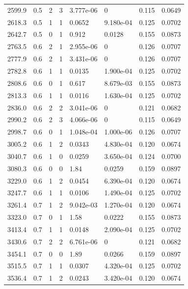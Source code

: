 \documentclass[preview]{standalone}
\begin{document}
{{{\begin{tabular}{L{1.2cm}C{1.2cm} C{0.3cm}C{0.5cm} C{1.4cm}C{1.4cm} C{1.4cm}C{1.4cm}}
  2599.9  &   0.5  & 2     &  3 &  3.777e-06  & 0  & 0.115 &  0.0649   \\ 
  2618.3  &   0.5  & 1     &  1 &  0.0652  & 9.180e-04  & 0.125 &  0.0702   \\ 
  2642.7  &   0.5  & 0     &  1 &  0.912  & 0.0128  & 0.155 &  0.0873   \\ 
  2763.5  &   0.6  & 2     &  1 &  2.955e-06  & 0  & 0.126 &  0.0707   \\ 
  2777.9  &   0.6  & 2     &  1 &  3.431e-06  & 0  & 0.126 &  0.0707   \\ 
  2782.8  &   0.6  & 1     &  1 &  0.0135  & 1.900e-04  & 0.125 &  0.0702   \\ 
  2808.6  &   0.6  & 0     &  1 &  0.617  & 8.679e-03  & 0.155 &  0.0873   \\ 
  2813.3  &   0.6  & 1     &  1 &  0.0116  & 1.630e-04  & 0.125 &  0.0702   \\ 
  2836.0  &   0.6  & 2     &  2 &  3.041e-06  & 0  & 0.121 &  0.0682   \\ 
  2990.2  &   0.6  & 2     &  3 &  4.066e-06  & 0  & 0.115 &  0.0649   \\ 
  2998.7  &   0.6  & 0     &  1 &  1.048e-04  & 1.000e-06  & 0.126 &  0.0707   \\ 
  3005.2  &   0.6  & 1     &  2 &  0.0343  & 4.830e-04  & 0.120 &  0.0674   \\ 
  3040.7  &   0.6  & 1     &  0 &  0.0259  & 3.650e-04  & 0.124 &  0.0700   \\ 
  3080.3  &   0.6  & 0     &  0 &  1.84  & 0.0259  & 0.159 &  0.0897   \\ 
  3229.0  &   0.6  & 1     &  2 &  0.0454  & 6.390e-04  & 0.120 &  0.0674   \\ 
  3247.7  &   0.6  & 1     &  1 &  0.0106  & 1.490e-04  & 0.125 &  0.0702   \\ 
  3261.4  &   0.7  & 1     &  2 &  9.042e-03  & 1.270e-04  & 0.120 &  0.0674   \\ 
  3323.0  &   0.7  & 0     &  1 &  1.58  & 0.0222  & 0.155 &  0.0873   \\ 
  3413.4  &   0.7  & 1     &  1 &  0.0148  & 2.090e-04  & 0.125 &  0.0702   \\ 
  3430.6  &   0.7  & 2     &  2 &  6.761e-06  & 0  & 0.121 &  0.0682   \\ 
  3454.1  &   0.7  & 0     &  0 &  1.89  & 0.0266  & 0.159 &  0.0897   \\ 
  3515.5  &   0.7  & 1     &  1 &  0.0307  & 4.320e-04  & 0.125 &  0.0702   \\ 
  3536.4  &   0.7  & 1     &  2 &  0.0243  & 3.420e-04  & 0.120 &  0.0674   \\ 

\end{tabular}}}}
\end{document}
